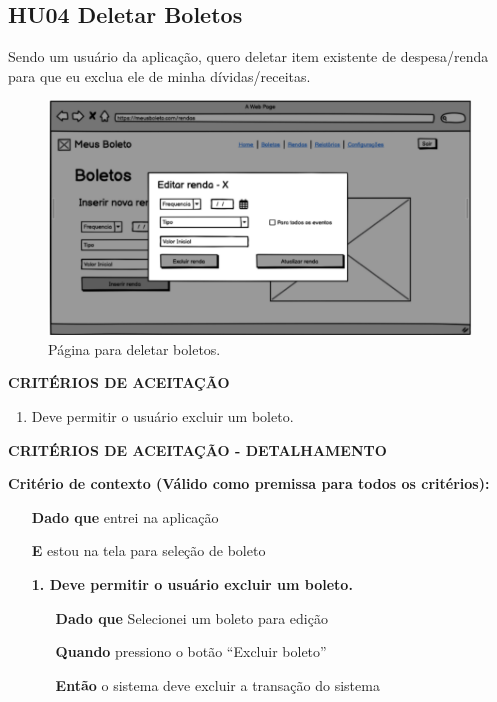 \subsection{HU04 Deletar Boletos}

Sendo um usuário da aplicação, quero deletar item existente de despesa/renda para que eu exclua ele de minha dívidas/receitas.

\begin{figure}[htb]
	\caption{\label{fig:hu04}Página para deletar boletos.}
	\begin{center}
		\includegraphics[scale=0.5]{images/EditarBoletoRenda.png}
	\end{center}
\end{figure}

\textbf{CRITÉRIOS DE ACEITAÇÃO}

\begin{enumerate}
    \item Deve permitir o usuário excluir um boleto.
\end{enumerate}

\textbf{CRITÉRIOS DE ACEITAÇÃO - DETALHAMENTO}

\textbf{Critério de contexto (Válido como premissa para todos os critérios):}

\begin{itemize}
    \item[\textbf{Dado que}] entrei na aplicação
    \item[\textbf{E}] estou na tela para seleção de boleto
\end{itemize}


\begin{itemize}
    \item[] \textbf{1. Deve permitir o usuário excluir um boleto.}

    \begin{itemize}
        \item[\textbf{Dado que}] Selecionei um boleto para edição
        \item[\textbf{Quando}] pressiono o botão ``Excluir boleto''
        \item[\textbf{Então}] o sistema deve excluir a transação do sistema
    \end{itemize}
\end{itemize}

